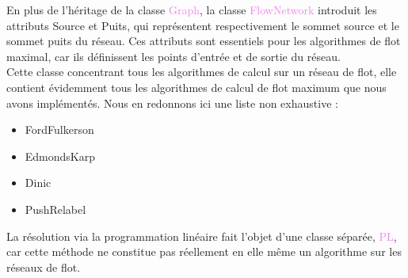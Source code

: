 \documentclass[a4paper]{article}
\begin{document}
En plus de l'héritage de la classe \textcolor{violet}{Graph}, la classe \textcolor{violet}{FlowNetwork} introduit les attributs \textcolor{blue!60}{Source} et \textcolor{blue!60}{Puits}, qui représentent respectivement le sommet source et le sommet puits du réseau. Ces attributs sont essentiels pour les algorithmes de flot maximal, car ils définissent les points d'entrée et de sortie du réseau.\\

Cette classe concentrant tous les algorithmes de calcul sur un réseau de flot, elle contient évidemment tous les algorithmes de calcul de flot maximum que nous avons implémentés. Nous en redonnons ici une liste non exhaustive :
\begin{itemize}
	\item \textcolor{green!60!black}{FordFulkerson}
	\item \textcolor{green!60!black}{EdmondsKarp}
	\item \textcolor{green!60!black}{Dinic}
	\item \textcolor{green!60!black}{PushRelabel}
\end{itemize}
La résolution via la programmation linéaire fait l'objet d'une classe séparée, \textcolor{violet}{PL}, car cette méthode ne constitue pas réellement en elle même un algorithme sur les réseaux de flot.\\
\end{document}
